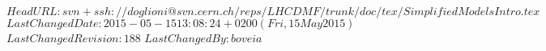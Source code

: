 \svnidlong
{$HeadURL: svn+ssh://doglioni@svn.cern.ch/reps/LHCDMF/trunk/doc/tex/SimplifiedModelsIntro.tex $}
{$LastChangedDate: 2015-05-15 13:08:24 +0200 (Fri, 15 May 2015) $}
{$LastChangedRevision: 188 $}
{$LastChangedBy: boveia $}

